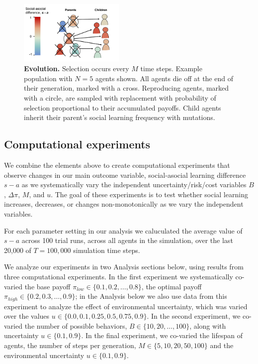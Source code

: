 \documentclass[10pt,letterpaper]{article}
\begin{document}
\begin{figure}
  \caption{\textbf{Evolution.} Selection occurs every $M$ time steps.
  Example population with $N=5$ agents shown. All agents die off at the end of
their generation, marked with a cross. Reproducing agents, marked with a circle, 
are sampled with replacement with probability of selection proportional to their 
accumulated payoffs. Child agents inherit their parent's social learning
frequency with mutations.}
  \label{fig:evolution}
  \centering
    \includegraphics[width=0.45\textwidth]{Figures/Evolution.pdf}
\end{figure}


\subsection{Computational experiments}

We combine the elements above to create computational experiments that observe
changes in our main outcome variable, social-asocial learning difference $s - a$
as we systematically vary the independent 
uncertainty/risk/cost variables $B$, $\Delta \pi$,
$M$, and $u$. The goal of these experiments is to test whether social learning
increases, decreases, or changes non-monotonically as we vary the 
independent variables.

For each parameter setting in our analysis we caluculated the average value of
$s-a$ across 100 trial runs, across all agents in the simulation, 
over the last 20,000 of $T = 100,000$ simulation time steps.

We analyze our experiments in two Analysis sections below, using results from
three computational experiments. In the first experiment we systematically co-varied
the base payoff $\pi_{low} \in \{0.1, 0.2, \ldots, 0.8\}$, the optimal payoff 
$\pi_{high} \in \{0.2, 0.3, \ldots, 0.9\}$;
in the Analysis below we also use data from this experiment to analyze 
the effect of environmental uncertainty, which was varied over the values 
$u \in \{0.0, 0.1, 0.25, 0.5, 0.75, 0.9\}$. In the second experiment, we 
co-varied the number of possible behaviors, $B \in \{10, 20, \ldots, 100\}$, 
along with uncertainty $u \in \{0.1, 0.9\}$. In the final experiment, we 
co-varied the lifespan of agents, the number of steps per generation, 
$M \in \{5, 10, 20, 50, 100\}$ and the environmental uncertainty $u \in \{0.1,
0.9\}$.
\end{document}
